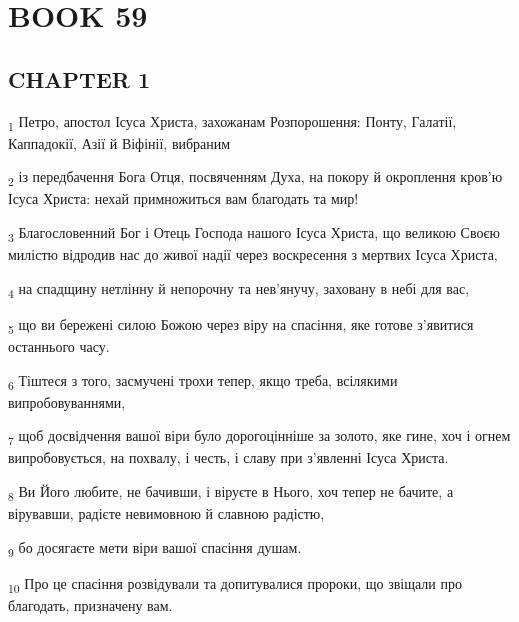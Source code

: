 \section{BOOK 59}
\subsection{CHAPTER 1}
\begin{tcolorbox}
\textsubscript{1} Петро, апостол Ісуса Христа, захожанам Розпорошення: Понту, Галатії, Каппадокії, Азії й Віфінії, вибраним
\end{tcolorbox}
\begin{tcolorbox}
\textsubscript{2} із передбачення Бога Отця, посвяченням Духа, на покору й окроплення кров'ю Ісуса Христа: нехай примножиться вам благодать та мир!
\end{tcolorbox}
\begin{tcolorbox}
\textsubscript{3} Благословенний Бог і Отець Господа нашого Ісуса Христа, що великою Своєю милістю відродив нас до живої надії через воскресення з мертвих Ісуса Христа,
\end{tcolorbox}
\begin{tcolorbox}
\textsubscript{4} на спадщину нетлінну й непорочну та нев'янучу, заховану в небі для вас,
\end{tcolorbox}
\begin{tcolorbox}
\textsubscript{5} що ви бережені силою Божою через віру на спасіння, яке готове з'явитися останнього часу.
\end{tcolorbox}
\begin{tcolorbox}
\textsubscript{6} Тіштеся з того, засмучені трохи тепер, якщо треба, всілякими випробовуваннями,
\end{tcolorbox}
\begin{tcolorbox}
\textsubscript{7} щоб досвідчення вашої віри було дорогоцінніше за золото, яке гине, хоч і огнем випробовується, на похвалу, і честь, і славу при з'явленні Ісуса Христа.
\end{tcolorbox}
\begin{tcolorbox}
\textsubscript{8} Ви Його любите, не бачивши, і віруєте в Нього, хоч тепер не бачите, а вірувавши, радієте невимовною й славною радістю,
\end{tcolorbox}
\begin{tcolorbox}
\textsubscript{9} бо досягаєте мети віри вашої спасіння душам.
\end{tcolorbox}
\begin{tcolorbox}
\textsubscript{10} Про це спасіння розвідували та допитувалися пророки, що звіщали про благодать, призначену вам.
\end{tcolorbox}
